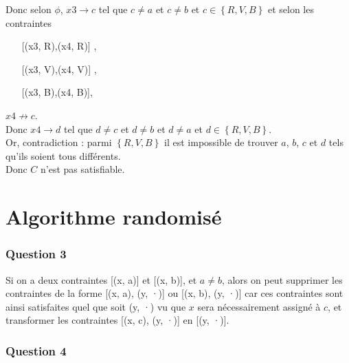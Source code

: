 \documentclass{report}
\begin{document}
Donc selon $\phi$, $x3 \rightarrow c$ tel que $c \neq a$ et $c \neq b$ et $c \in \left\{R, V, B\right\}$ et selon les contraintes
\begin{itemize}
\item[] [(x3, R),(x4, R)] ,
\item[] [(x3, V),(x4, V)] ,
\item[] [(x3, B),(x4, B)],
\end{itemize}
$x4 \not\rightarrow c$.\\

Donc $x4 \rightarrow d$ tel que $d \neq c$ et $d \neq b$ et $d \neq a$ et $d \in \left\{R, V, B\right\}$.\\
Or,  contradiction : parmi $\left\{R, V, B\right\}$ il est impossible de trouver $a$, $b$, $c$ et $d$ tels qu'ils soient tous différents.\\
Donc $C$ n'est pas satisfiable.

\section*{Algorithme randomisé}
\subsubsection*{Question 3}

Si on a deux contraintes [(x, a)] et [(x, b)], et $a \neq b$, alors on peut supprimer les contraintes de la forme [(x, a), (y, ·)] ou [(x, b), (y, ·)] car ces contraintes sont ainsi satisfaites quel que soit (y, ·) vu que $x$ sera nécessairement assigné à $c$, et transformer les contraintes [(x, c), (y, ·)] en [(y, ·)].

\subsubsection*{Question 4}
\end{document}
